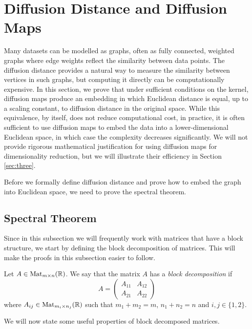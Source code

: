 \section{Diffusion Distance and Diffusion Maps}\label{sec:two}

Many datasets can be modelled as graphs, often as fully connected, weighted graphs where edge weights reflect the similarity between data points. The diffusion distance provides a natural way to measure the similarity between vertices in such graphs, but computing it directly can be computationally expensive. In this section, we prove that under sufficient conditions on the kernel, diffusion maps produce an embedding in which Euclidean distance is equal, up to a scaling constant, to diffusion distance in the original space. While this equivalence, by itself, does not reduce computational cost, in practice, it is often sufficient to use diffusion maps to embed the data into a lower-dimensional Euclidean space, in which case the complexity decreases significantly. We will not provide rigorous mathematical justification for using diffusion maps for dimensionality reduction, but we will illustrate their efficiency in Section \ref{sec:three}.

Before we formally define diffusion distance and prove how to embed the graph into Euclidean space, we need to prove the spectral theorem.
\subsection{Spectral Theorem}\label{subsection1}
Since in this subsection we will frequently work with matrices that have a block structure, we start by defining the block decomposition of matrices. This will make the proofs in this subsection easier to follow.

\begin{df}
    Let $A\in\text{Mat}_{m\times n}(\mathbb{R})$. We say that the matrix $A$ has a \textit{block decomposition} if
    $$
    A = 
    \left(
      \begin{array}{c|c}
        A_{11} & A_{12} \\ \hline
        A_{21} & A_{22}
      \end{array}
    \right)
    $$
where $A_{ij}\in\text{Mat}_{m_i\times n_j}(\mathbb{R})$ such that $m_1+m_2 = m$, $n_1+n_2 = n$ and $i,j\in\{1,2\}$.
\end{df}

We will now state some useful properties of block decomposed matrices.

